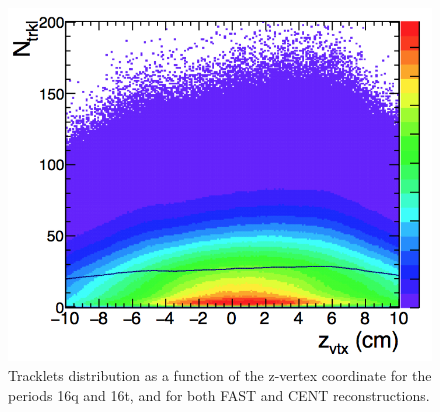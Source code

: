 \begin{figure}[h]
\centering
 \includegraphics[width=.6\textwidth]{FigCap6/NtrklVsVxtZ_Data.png}
 \caption{Tracklets distribution as a function of the z-vertex coordinate for the periods 16q and 16t, and for both FAST and CENT reconstructions.}
 \label{fig:NtrklVsZ2D}
\end{figure}



